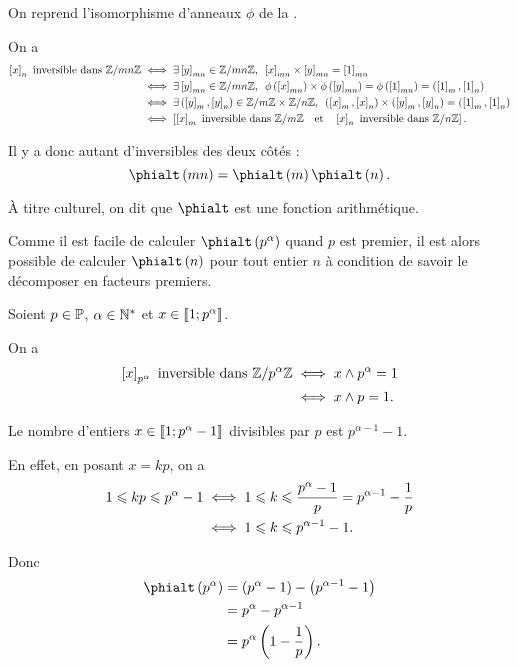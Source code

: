 \begin{dem}
On reprend l'isomorphisme d'anneaux \(\phi\) de la .

On a \[\begin{aligned}
\croch{x}_n\text{ inversible dans }\znz{mn}&\ssi\quantifs{\exists\croch{y}_{mn}\in\znz{mn}}\croch{x}_{mn}\times\croch{y}_{mn}=\croch{1}_{mn} \\
&\ssi\quantifs{\exists\croch{y}_{mn}\in\znz{mn}}\phi\paren{\croch{x}_{mn}}\times\phi\paren{\croch{y}_{mn}}=\phi\paren{\croch{1}_{mn}}=\paren{\croch{1}_m,\croch{1}_n} \\
&\ssi\quantifs{\exists\paren{\croch{y}_m,\croch{y}_n}\in\znz{m}\times\znz{n}}\paren{\croch{x}_m,\croch{x}_n}\times\paren{\croch{y}_m,\croch{y}_n}=\paren{\croch{1}_m,\croch{1}_n} \\
&\ssi\croch{\croch{x}_m\text{ inversible dans }\znz{m}\quad\text{et}\quad\croch{x}_n\text{ inversible dans }\znz{n}}.
\end{aligned}\]

Il y a donc autant d'inversibles des deux côtés : \[\phialt\paren{mn}=\phialt\paren{m}\phialt\paren{n}.\]
\end{dem}

À titre culturel, on dit que \(\phialt\) est une fonction arithmétique.

Comme il est facile de calculer \(\phialt\paren{p^\alpha}\) quand \(p\) est premier, il est alors possible de calculer \(\phialt\paren{n}\) pour tout entier \(n\) à condition de savoir le décomposer en facteurs premiers.

\begin{dem}
Soient \(p\in\mathbb{P}\), \(\alpha\in\mathbb{N}^*\) et \(x\in\left\llbracket1;p^\alpha\right\rrbracket\).

On a \[\begin{aligned}
\left[x\right]_{p^\alpha}\text{ inversible dans }\mathbb{Z}/p^\alpha\mathbb{Z}&\iff x\land p^\alpha=1 \\
&\iff x\land p=1.
\end{aligned}\]

Le nombre d'entiers \(x\in\left\llbracket1;p^\alpha-1\right\rrbracket\) divisibles par \(p\) est \(p^{\alpha-1}-1\).

En effet, en posant \(x=kp\), on a \[\begin{aligned}
1\leqslant kp\leqslant p^\alpha-1&\iff1\leqslant k\leqslant\dfrac{p^\alpha-1}{p}=p^{\alpha-1}-\dfrac{1}{p} \\
&\iff1\leqslant k\leqslant p^{\alpha-1}-1.
\end{aligned}\]

Donc \[\begin{aligned}
\phialt\paren{p^\alpha}&=\paren{p^\alpha-1}-\paren{p^{\alpha-1}-1} \\
&=p^\alpha-p^{\alpha-1} \\
&=p^\alpha\paren{1-\dfrac{1}{p}}.
\end{aligned}\]
\end{dem}


